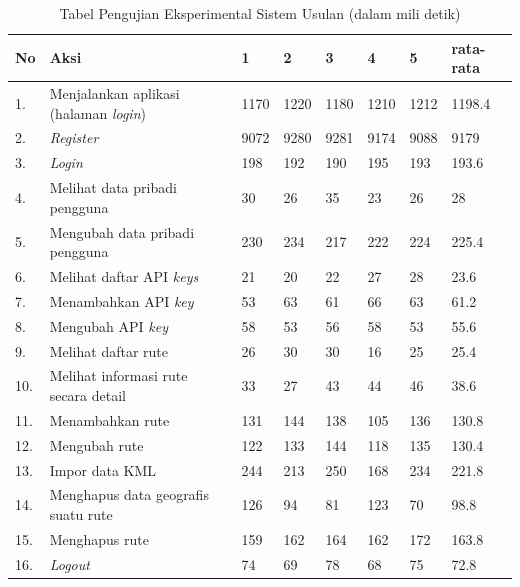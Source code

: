 \begin{table}[H]
	\centering
	\caption{Tabel Pengujian Eksperimental Sistem Usulan (dalam mili detik)}
		\begin{tabular}{|p{0.37cm}| p{7cm}| p{1cm}| p{1cm}| p{1cm}| p{1cm}| p{1cm}| p{1cm}|} \hline
		No & Aksi & 1 & 2 & 3 & 4 & 5 & rata-rata \\ \hline
		1. & Menjalankan aplikasi (halaman \textit{login}) & 1170	&	1220	&	1180	&	1210	&	1212	&	1198.4 \\ \hline
 		2. & \textit{Register} & 9072	&	9280	&	9281	&	9174	&	9088	&	9179 \\ \hline
		3. & \textit{Login} & 198	&	192	&	190	&	195	&	193	&	193.6 \\ \hline
		4. & Melihat data pribadi pengguna & 30	&	26	&	35	&	23	&	26	&	28 \\ \hline
		5. & Mengubah data pribadi pengguna & 230	&	234	&	217	&	222	&	224	&	225.4 \\ \hline
		6. & Melihat daftar API \textit{keys} & 21	&	20	&	22	&	27	&	28	&	23.6 \\ \hline
		7. & Menambahkan API \textit{key} & 53	&	63	&	61	&	66	&	63	&	61.2 \\ \hline
		8. & Mengubah API \textit{key} & 58	&	53	&	56	&	58	&	53	&	55.6 \\ \hline
		9. & Melihat daftar rute & 26	&	30	&	30	&	16	&	25	&	25.4 \\ \hline
		10. & Melihat informasi rute secara detail & 33	&	27	&	43	&	44	&	46	&	38.6 \\ \hline
		11. & Menambahkan rute & 131	&	144	&	138	&	105	&	136	&	130.8 \\ \hline
		12. & Mengubah rute & 122	&	133	&	144	&	118	&	135	&	130.4 \\ \hline
		13. & Impor data KML & 244	&	213	&	250	&	168	&	234	&	221.8 \\ \hline
		14. & Menghapus data geografis suatu rute & 126	&	94	&	81	&	123	&	70	&	98.8 \\ \hline
		15. & Menghapus rute & 159	&	162	&	164	&	162	&	172	&	163.8 \\ \hline
		16. & \textit{Logout} & 74	&	69	&	78	&	68	&	75	&	72.8 \\ \hline
		\end{tabular}
	\label{table:hasileksperimental2}
\end{table}

